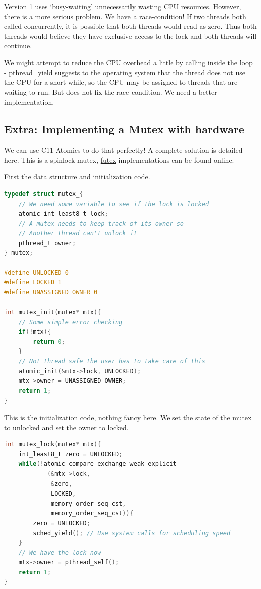 Version 1 uses `busy-waiting' unnecessarily wasting CPU resources.
However, there is a more serious problem.
We have a race-condition!
If two threads both called  concurrently, it is possible that both threads would read  as zero.
Thus both threads would believe they have exclusive access to the lock and both threads will continue.

We might attempt to reduce the CPU overhead a little by calling  inside the loop - pthread\_yield suggests to the operating system that the thread does not use the CPU for a short while, so the CPU may be assigned to threads that are waiting to run.
But does not fix the race-condition.
We need a better implementation.

\subsection{Extra: Implementing a Mutex with hardware}

We can use C11 Atomics to do that perfectly!
A complete solution is detailed here.
This is a spinlock mutex, \href{https://locklessinc.com/articles/mutex_cv_futex/}{futex} implementations can be found online.

First the data structure and initialization code.

\begin{lstlisting}[language=C]
typedef struct mutex_{
    // We need some variable to see if the lock is locked
    atomic_int_least8_t lock;
    // A mutex needs to keep track of its owner so
    // Another thread can't unlock it
    pthread_t owner;
} mutex;

#define UNLOCKED 0
#define LOCKED 1
#define UNASSIGNED_OWNER 0

int mutex_init(mutex* mtx){
    // Some simple error checking
    if(!mtx){
        return 0;
    }
    // Not thread safe the user has to take care of this
    atomic_init(&mtx->lock, UNLOCKED);
    mtx->owner = UNASSIGNED_OWNER;
    return 1;
}
\end{lstlisting}

This is the initialization code, nothing fancy here.
We set the state of the mutex to unlocked and set the owner to locked.

\begin{lstlisting}[language=C]
int mutex_lock(mutex* mtx){
    int_least8_t zero = UNLOCKED;
    while(!atomic_compare_exchange_weak_explicit
            (&mtx->lock,
             &zero,
             LOCKED,
             memory_order_seq_cst,
             memory_order_seq_cst)){
        zero = UNLOCKED;
        sched_yield(); // Use system calls for scheduling speed
    }
    // We have the lock now
    mtx->owner = pthread_self();
    return 1;
}
\end{lstlisting}

